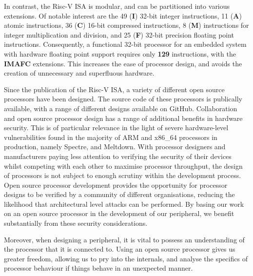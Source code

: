 \documentclass[a4paper,8pt]{report}
\begin{document}
In contrast, the Risc-V ISA is modular, and can be partitioned into various extensions. Of
notable interest are the 49 (\textbf{I}) 32-bit integer instructions, 11
(\textbf{A}) atomic instructions, 36 (\textbf{C}) 16-bit compressed instructions, 8
(\textbf{M}) instructions for integer multiplication and division, and 25
(\textbf{F}) 32-bit precision floating point instructions. Consequently, a
functional 32-bit processor for an embedded system with hardware floating point
support requires only \textbf{129} instructions, with the \textbf{IMAFC}
extensions. This increases the ease of processor design, and avoids the creation
of unnecessary and superfluous hardware. 


Since the publication of the Risc-V ISA, a variety of different open source
processors have been designed. The source code of these processors is publically
available, with a range of different designs available on GitHub. Collaboration
and open source processor design has a range of additional benefits in hardware
security. This is of particular relevance in the light of severe hardware-level
vulnerabilities found in the majority of ARM and x86\_64 processors in
production, namely Spectre, and Meltdown. With processor designers and
manufacturers paying less attention to verifying the security of their devices
whilst competing with each other to maximise processor throughput, the design of
processors is not subject to enough scrutiny within the development process.
Open source processor development provides the opportunity for processor designs
to be verified by a community of different organisations, reducing the
likelihood that architectural level attacks can be performed. By basing our work
on an open source processor in the development of our peripheral, we benefit
substantially from these security considerations.

Moreover, when designing a peripheral, it is vital to possess an understanding
of the processor that it is connected to. Using an open source processor gives
us greater freedom, allowing us to pry into the internals, and analyse the
specifics of processor behaviour if things behave in an unexpected manner.
\end{document}
